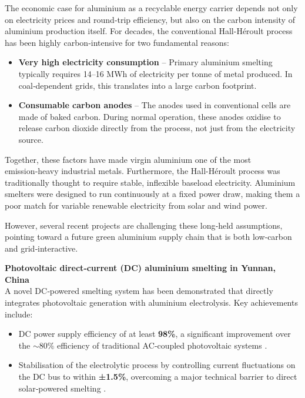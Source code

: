 \documentclass[12pt]{article}
\begin{document}
The economic case for aluminium as a recyclable energy carrier depends not only on electricity prices and round‑trip efficiency, but also on the carbon intensity of aluminium production itself. For decades, the conventional Hall-Héroult process has been highly carbon‑intensive for two fundamental reasons:

\begin{itemize}
\item \textbf{Very high electricity consumption} – Primary aluminium smelting typically requires 14–16 MWh of electricity per tonne of metal produced. In coal‑dependent grids, this translates into a large carbon footprint.
\item \textbf{Consumable carbon anodes} – The anodes used in conventional cells are made of baked carbon. During normal operation, these anodes oxidise to release carbon dioxide directly from the process, not just from the electricity source.
\end{itemize}

Together, these factors have made virgin aluminium one of the most emission‑heavy industrial metals. Furthermore, the Hall-Héroult process was traditionally thought to require stable, inflexible baseload electricity. Aluminium smelters were designed to run continuously at a fixed power draw, making them a poor match for variable renewable electricity from solar and wind power.

However, several recent projects are challenging these long‑held assumptions, pointing toward a future green aluminium supply chain that is both low‑carbon and grid‑interactive.

\textbf{Photovoltaic direct‑current (DC) aluminium smelting in Yunnan, China} \\
A novel DC‑powered smelting system has been demonstrated that directly integrates photovoltaic generation with aluminium electrolysis. Key achievements include:

\begin{itemize}
\item DC power supply efficiency of at least \textbf{98\%}, a significant improvement over the \(\sim80\%\) efficiency of traditional AC‑coupled photovoltaic systems \cite{dc-aluminium-basic}.
\item Stabilisation of the electrolytic process by controlling current fluctuations on the DC bus to within \textbf{±1.5\%}, overcoming a major technical barrier to direct solar‑powered smelting \cite{dc-aluminium-basic}.
\end{itemize}
\end{document}
